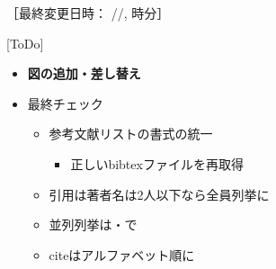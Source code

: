 ［最終変更日時：
{\the\year/\the\month/\the\day, {\the\hour} 時{\the\minute}分}］

 [ToDo]
\begin{itemize}
  \item \textbf{図の追加・差し替え}
  \item 最終チェック
  \begin{itemize}
    \item 参考文献リストの書式の統一
    \begin{itemize}
      \item 正しいbibtexファイルを再取得
    \end{itemize}
    \item 引用は著者名は2人以下なら全員列挙に
    \item 並列列挙は・で
    \item citeはアルファベット順に
    
  \end{itemize}
\end{itemize}
